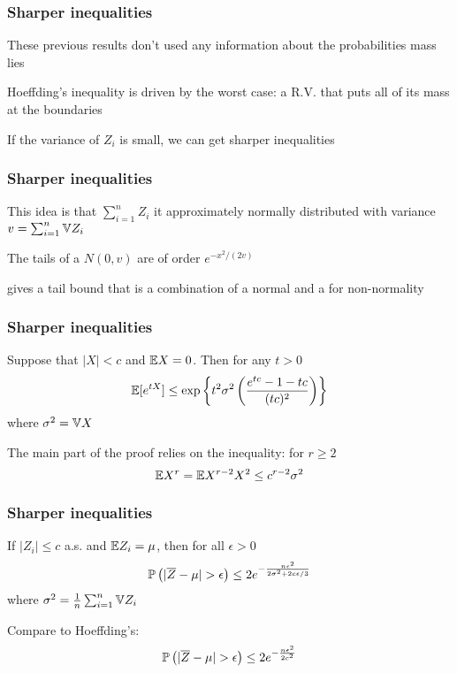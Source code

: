 \documentclass[12pt]{beamer}
\begin{document}
\begin{frame}[fragile]
\frametitle{Sharper inequalities}
These previous results don't used any information about  the probabilities mass lies

\vsp
Hoeffding's inequality is driven by the worst case: a R.V. that puts all of its mass at the boundaries

\vsp
If the variance of $Z_i$ is small, we can get sharper inequalities 
\end{frame}

\begin{frame}[fragile]
\frametitle{Sharper inequalities}

This idea is that $\sum_{i=1}^n Z_i$ it approximately normally distributed with variance $v = \sum_{i=1}^n \V Z_i$

\vsp
The tails of a $N(0,v)$ are of order $e^{-x^2/(2v)}$

\vsp
{} gives a tail bound that is a combination of a normal and a  for non-normality
\end{frame}
\begin{frame}[fragile]
\frametitle{Sharper inequalities}

Suppose that $|X| < c$ and $\E X = 0$. Then for any $t > 0$
\[
\E[e^{tX}] \leq \exp\left\{ t^2 \sigma^2 \left( \frac{e^{tc} - 1 -tc}{(tc)^2} \right) \right\}
\]
where $\sigma^2 = \V X$

\vsp
{} The main part of the proof relies on the inequality: for $r \geq 2$
\[
\E X^r = \E X^{r-2}X^2 \leq c^{r-2}\sigma^2
\]

\end{frame}


\begin{frame}[fragile]
\frametitle{Sharper inequalities}
If $|Z_i| \leq c$ a.s. and $\E Z_i = \mu$, then for all $\epsilon > 0$
\[
\P\left( |\overline{Z} - \mu| > \epsilon\right) \leq 2e^{-\frac{n\epsilon^2}{2\sigma^2 + 2c\epsilon/3}}
\]
where $\sigma^2 = \frac{1}{n} \sum_{i=1}^n\V Z_i$
\vsp

Compare to Hoeffding's:
\[
\P\left( |\overline{Z} - \mu| > \epsilon\right) \leq 2e^{-\frac{n\epsilon^2}{2c^2}}
\]
\end{frame}
\end{document}
